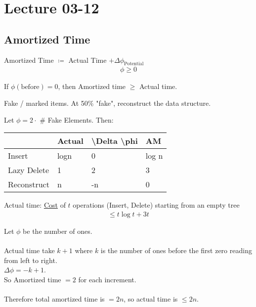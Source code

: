 \documentclass[class=scrartcl, crop=false]{standalone}
\date{2020-03-12}
\begin{document}
\section{Lecture 03-12}

\subsection{Amortized Time}

\begin{definition}
  Amortized Time $\coloneqq$ Actual Time $+ \Delta \phi_{\text{Potential}}$ 
  \begin{gather*}
    \phi \geq 0
  \end{gather*} 
\end{definition} 

\begin{note}
  If $\phi(\text{before}) = 0$, then Amortized time $\geq$ Actual time.
\end{note} 

\begin{example}
  \begin{itemize}
    \ii
    Fake / marked items.
    \ii
    At 50\% "fake", reconstruct the data structure.
  \end{itemize} 
  Let $\phi = 2 \cdot$ \# Fake Elements. Then:
  \begin{center}
  \begin{table}[]
  \begin{tabular}{|l|l|l|l|}
  \hline
              & Actual & \textbackslash{}Delta \textbackslash{}phi & AM    \\ \hline
  Insert      & logn   & 0                                         & log n \\ \hline
  Lazy Delete & 1      & 2                                         & 3     \\ \hline
  Reconstruct & n      & -n                                        & 0     \\ \hline
  \end{tabular}
  \end{table}
  \end{center} 
  Actual time: \ul{Cost} of $t$ operations (Insert, Delete) starting from an empty tree %
  \begin{gather*}
    \leq t \log t + 3t
  \end{gather*} 
\end{example} 

\begin{example}
  Let $\phi$ be the number of ones.
  \\\\
  Actual time take  $k + 1$ where $k$ is the number of ones before the first zero reading from left to right.
  \\
  $\Delta \phi = -k + 1$. \\
  So Amortized time $= 2$ for each increment.
  \\\\
  Therefore total amortized time is $= 2n$, so actual time is $\leq 2n$.
\end{example} 
\end{document}
